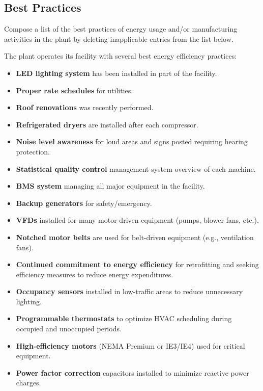 \subsection{Best Practices}
\begin{tcolorbox}[colback=green!25]
    Compose a list of the best practices of energy usage and/or manufacturing activities in the plant by deleting inapplicable entries from the list below. 
\end{tcolorbox}
\noindent The plant operates its facility with several best energy efficiency practices: 
    \begin{itemize}\itemsep -2pt
        \item \textbf{LED lighting system} has been installed in part of the facility.
        \item \textbf{Proper rate schedules} for utilities.
        \item \textbf{Roof renovations} was recently performed.
        \item \textbf{Refrigerated dryers} are installed after each compressor.
        \item \textbf{Noise level awareness} for loud areas and signs posted requiring hearing protection.
        \item \textbf{Statistical quality control} management system overview of each machine.
        \item \textbf{BMS system} managing all major equipment in the facility.
        \item \textbf{Backup generators} for safety/emergency.
        \item \textbf{VFDs} installed for many motor-driven equipment (pumps, blower fans, etc.).
        \item \textbf{Notched motor belts} are used for belt-driven equipment (e.g., ventilation fans).
        \item \textbf{Continued commitment to energy efficiency} for retrofitting and seeking efficiency measures to reduce energy expenditures.
        \item \textbf{Occupancy sensors} installed in low-traffic areas to reduce unnecessary lighting.
        \item \textbf{Programmable thermostats} to optimize HVAC scheduling during occupied and unoccupied periods.
        \item \textbf{High-efficiency motors} (NEMA Premium or IE3/IE4) used for critical equipment.
        \item \textbf{Power factor correction} capacitors installed to minimize reactive power charges.

\end{itemize}
